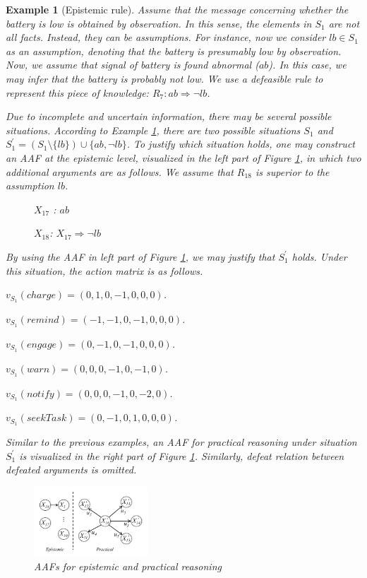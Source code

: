 \documentclass[letterpaper]{article} %
\newtheorem{example}{Example}
\begin{document}
\begin{example}[Epistemic rule]\label{ex-ep-rules}
Assume that the message concerning whether the battery is low is obtained by observation. In this sense, the elements in $S_1$ are not all facts. Instead, they can be assumptions. For instance, now we consider $lb\in S_1$ as an assumption, denoting that the battery is presumably low by observation. Now, we assume that signal of battery is found abnormal ($ab$). In this case, we may infer that the battery is probably not low. We use a defeasible rule to represent this piece of knowledge: $R_7: ab \Rightarrow \neg lb$.
 
Due to incomplete and uncertain information, there may be several possible situations. According to Example \ref{ex-ep-rules}, there are two possible situations $S_1$ and $S_1^\prime = (S_1 \setminus \{lb\})\cup \{ab, \neg lb\}$. To justify which situation holds, one may construct an AAF at the epistemic level, visualized in the left part of Figure \ref{fig:ex-21}, in which two additional arguments are as follows. We assume that $R_{18}$ is superior to the assumption $lb$.
\begin{description}
\item[]$X_{17}$ : $ab$
\item[]$X_{18}$: $X_{17} \Rightarrow \neg lb$
\end{description}

By using the AAF in left part of Figure \ref{fig:ex-21}, we may justify that $S_1^\prime$ holds. Under this situation, the action matrix is as follows.

\begin{description}
\item $v_{S_1}(charge) = (0, 1,  0, -1, 0, 0, 0)$.
\item $v_{S_1}(remind) = (-1, -1, 0, -1, 0, 0, 0)$.
\item $v_{S_1}(engage) = (0, -1, 0, -1, 0, 0, 0)$.
\item $v_{S_1}(warn) = (0, 0, 0, -1, 0, -1, 0)$.
\item $v_{S_1}(notify) = (0, 0, 0, -1, 0, -2, 0)$.
\item $v_{S_1}(seekTask) = (0, -1, 0, 1, 0, 0, 0)$.
\end{description}

Similar to the previous examples, an AAF for practical reasoning under situation $S^\prime_1$ is visualized in the right part of Figure \ref{fig:ex-21}. Similarly, defeat relation between defeated arguments is omitted.

\begin{figure}[h!]
  \centering
 \includegraphics[width=0.38\textwidth]{exam5.png}
  \caption{AAFs for epistemic and practical reasoning}
    \label{fig:ex-21}
\end{figure}
\end{example}
\end{document}
